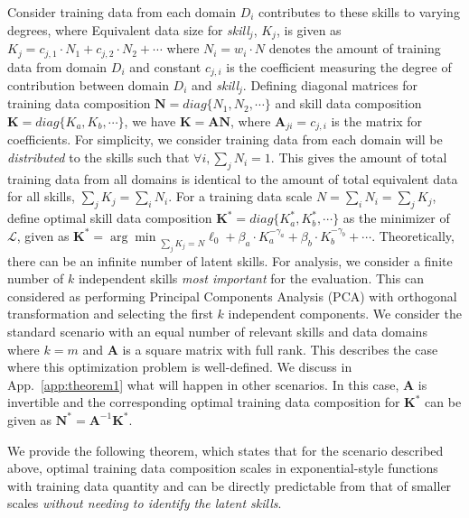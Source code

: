 \documentclass{article} %
\begin{document}
\begin{appendices}{}
Consider training data from each domain $D_i$ contributes to these skills to varying degrees, where Equivalent data size for \textit{skill$_j$}, $K_j$, is given as
$
K_j = c_{j,1}\cdot N_1 + c_{j,2}\cdot N_2 + \cdots
$
where $N_i=w_i\cdot N$ denotes the amount of training data from domain $D_i$ and constant $c_{j,i}$ is the coefficient measuring the degree of contribution between domain $D_i$ and \textit{skill$_j$}.
Defining diagonal matrices for training data composition $\mathbf{N}=diag\{N_1,N_2, \cdots\}$ and skill data composition $\mathbf{K}=diag\{K_a,K_b,\cdots\}$, we have 
$
\mathbf{K} = \mathbf{A}\mathbf{N}
$,
where $\mathbf{A}_{ji}=c_{j,i}$ is the matrix for coefficients. 
For simplicity, we consider training data from each domain will be \textit{distributed} to the skills such that $\forall i, \sum_j N_i = 1 $. This gives the amount of total training data from all domains is identical to the amount of total equivalent data for all skills, $\sum_j K_j = \sum_i N_i$.
For a training data scale $N=\sum_i N_i=\sum_j K_j$, define optimal skill data composition $\mathbf{K^*}=diag\{K_a^*, K_b^*, \cdots\}$ as the minimizer of $\mathcal{L}$, given as
$
    \mathbf{K^*} = {\arg\min}_{\sum_j K_j=N} \ell_0+\beta_a\cdot K_a^{-\gamma_a}+\beta_b\cdot K_b^{-\gamma_b}+ \cdots
$. 
Theoretically, there can be an infinite number of latent skills. For analysis, we consider a finite number of $k$ independent skills \textit{most important} for the evaluation. This can considered as performing Principal Components Analysis (PCA) with orthogonal transformation and selecting the first $k$ independent components. We consider the standard scenario with an equal number of relevant skills and data domains where $k=m$ and $\mathbf{A}$ is a square matrix with full rank. This describes the case where this optimization problem is well-defined. We discuss in App.~\ref{app:theorem1} what will happen in other scenarios. 
In this case, $\mathbf{A}$ is invertible and the corresponding optimal training data composition for $\mathbf{K^*}$ can be given as
$
\mathbf{N^*} =  \mathbf{A}^{-1}\mathbf{K^*}
$.

We provide the following theorem, which states that for the scenario described above, optimal training data composition scales in exponential-style functions with training data quantity and can be directly predictable from that of smaller scales \textit{without needing to identify the latent skills}.


\end{appendices}
\end{document}
